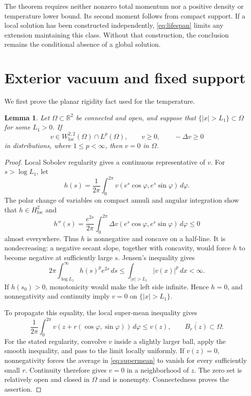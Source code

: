 \documentclass[11pt,letterpaper]{article}
\numberwithin{equation}{section}
\newtheorem{lemma}[theorem]{Lemma}
\theoremstyle{definition}
\newcommand{\R}{\mathbb R}
\newcommand{\dd}{\,dx}
\begin{document}
The theorem requires neither nonzero total momentum nor a positive
density or temperature lower bound. Its second moment follows from
compact support. If a local solution has been constructed
independently, \eqref{eq:lifespan} limits any extension maintaining
this class. Without that construction, the conclusion remains the
conditional absence of a global solution.

\section{Exterior vacuum and fixed support}\label{sec:exterior}

We first prove the planar rigidity fact used for the temperature.

\begin{lemma}\label{lem:superharmonic}
Let $\Omega\subset\R^2$ be connected and open, and suppose that
$\{|x|>L_1\}\subset\Omega$ for some $L_1>0$. If
\[
 v\in W^{2,2}_{\mathrm{loc}}(\Omega)\cap L^p(\Omega),\qquad
 v\ge0,\qquad -\Delta v\ge0
\]
in distributions, where $1\le p<\infty$, then $v=0$ in $\Omega$.
\end{lemma}

\begin{proof}
Local Sobolev regularity gives a continuous representative of $v$.
For $s>\log L_1$, let
\[
 h(s)=\frac1{2\pi}\int_0^{2\pi}
           v(e^s\cos\varphi,e^s\sin\varphi)\,d\varphi.
\]
The polar change of variables on compact annuli and angular
integration show that $h\in H^2_{\mathrm{loc}}$ and
\begin{equation}
 h''(s)=\frac{e^{2s}}{2\pi}\int_0^{2\pi}
             \Delta v(e^s\cos\varphi,e^s\sin\varphi)\,d\varphi
       \le0
 \label{eq:concavemean}
\end{equation}
almost everywhere. Thus $h$ is nonnegative and concave on a half-line.
It is nondecreasing: a negative secant slope, together with concavity,
would force $h$ to become negative at sufficiently large $s$.
Jensen's inequality gives
\begin{equation}
 2\pi\int_{\log L_1}^{\infty} h(s)^p e^{2s}\,ds
       \le\int_{|x|>L_1}|v(x)|^p\dd<\infty.
 \label{eq:meanLp}
\end{equation}
If $h(s_0)>0$, monotonicity would make the left side infinite.
Hence $h=0$, and nonnegativity and continuity imply $v=0$ on
$\{|x|>L_1\}$.

To propagate this equality, the local super-mean inequality gives
\begin{equation}
 \frac1{2\pi}\int_0^{2\pi}
       v(z+r(\cos\varphi,\sin\varphi))\,d\varphi\le v(z),
 \qquad \overline{B_r(z)}\subset\Omega.
 \label{eq:supermean}
\end{equation}
For the stated regularity, convolve $v$ inside a slightly larger
ball, apply the smooth inequality, and pass to the limit locally
uniformly. If $v(z)=0$, nonnegativity forces the average in
\eqref{eq:supermean} to vanish for every sufficiently small $r$.
Continuity therefore gives $v=0$ in a neighborhood of $z$.
The zero set is relatively open and closed in $\Omega$ and is
nonempty. Connectedness proves the assertion.
\end{proof}
\end{document}
